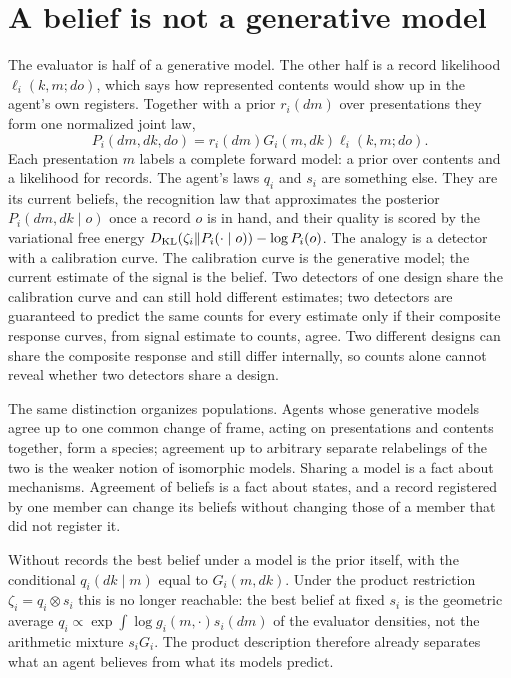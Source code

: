 \section{A belief is not a generative model}

The evaluator is half of a generative model. The other half is a record likelihood $\ell_i(k,m;do)$, which says how represented contents would show up in the agent's own registers. Together with a prior $r_i(dm)$ over presentations they form one normalized joint law,
\begin{equation}
P_i(dm,dk,do)=r_i(dm)G_i(m,dk)\ell_i(k,m;do).
\label{comp:eq-generative-model}
\end{equation}
Each presentation $m$ labels a complete forward model: a prior over contents and a likelihood for records. The agent's laws $q_i$ and $s_i$ are something else. They are its current beliefs, the recognition law that approximates the posterior $P_i(dm,dk\mid o)$ once a record $o$ is in hand, and their quality is scored by the variational free energy $D_{\mathrm{KL}}(\zeta_i\Vert P_i(\cdot\mid o))-\log P_i(o)$. The analogy is a detector with a calibration curve. The calibration curve is the generative model; the current estimate of the signal is the belief. Two detectors of one design share the calibration curve and can still hold different estimates; two detectors are guaranteed to predict the same counts for every estimate only if their composite response curves, from signal estimate to counts, agree. Two different designs can share the composite response and still differ internally, so counts alone cannot reveal whether two detectors share a design.

The same distinction organizes populations. Agents whose generative models agree up to one common change of frame, acting on presentations and contents together, form a species; agreement up to arbitrary separate relabelings of the two is the weaker notion of isomorphic models. Sharing a model is a fact about mechanisms. Agreement of beliefs is a fact about states, and a record registered by one member can change its beliefs without changing those of a member that did not register it.

Without records the best belief under a model is the prior itself, with the conditional $q_i(dk\mid m)$ equal to $G_i(m,dk)$. Under the product restriction $\zeta_i=q_i\otimes s_i$ this is no longer reachable: the best belief at fixed $s_i$ is the geometric average $q_i\propto\exp\int\log g_i(m,\cdot)s_i(dm)$ of the evaluator densities, not the arithmetic mixture $s_iG_i$. The product description therefore already separates what an agent believes from what its models predict.

